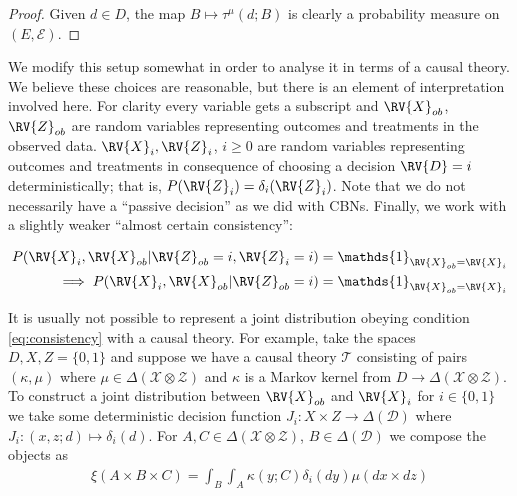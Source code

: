 \begin{proof}
Given $d\in D$, the map $B\mapsto \tau^\mu(d;B)$ is clearly a probability measure on $(E,\mathcal{E})$.

 
\end{proof}




We modify this setup somewhat in order to analyse it in terms of a causal theory. We believe these choices are reasonable, but there is an element of interpretation involved here. For clarity every variable gets a subscript and $\RV{X}_{ob}$, $\RV{Z}_{ob}$ are random variables representing outcomes and treatments in the observed data. $\RV{X}_i, \RV{Z}_i$, $i\geq 0$ are random variables representing outcomes and treatments in consequence of choosing a decision $\RV{D}=i$ deterministically; that is, $P(\RV{Z}_i) = \delta_i(\RV{Z}_i)$. Note that we do not necessarily have a ``passive decision'' as we did with CBNs. Finally, we work with a slightly weaker ``almost certain consistency'':

\begin{align}
    P(\RV{X}_i,\RV{X}_{ob}|\RV{Z}_{ob}=i,\RV{Z}_i=i)&=\mathds{1}_{\RV{X}_{ob}=\RV{X}_i} \label{eq:consistency}\\
    \implies P(\RV{X}_i,\RV{X}_{ob}|\RV{Z}_{ob}=i)&=\mathds{1}_{\RV{X}_{ob}=\RV{X}_i}
\end{align}

It is usually not possible to represent a joint distribution obeying condition \ref{eq:consistency} with a causal theory. For example, take the spaces $D,X,Z=\{0,1\}$ and suppose we have a causal theory $\mathscr{T}$ consisting of pairs $(\kappa,\mu)$ where $\mu\in\Delta(\mathcal{X}\otimes\mathcal{Z})$ and $\kappa$ is a Markov kernel from $D\to \Delta(\mathcal{X}\otimes\mathcal{Z})$. To construct a joint distribution between $\RV{X}_{ob}$ and $\RV{X}_i$ for $i\in \{0,1\}$ we take some deterministic decision function $J_i:X\times Z\to \Delta(\mathcal{D})$ where $J_i:(x,z;d)\mapsto \delta_i(d)$. For $A,C\in \Delta(\mathcal{X}\otimes\mathcal{Z})$, $B\in \Delta(\mathcal{D})$ we compose the objects as 
\begin{align}
    \xi(A\times B\times C) =  \int_B \int_A  \kappa(y; C) \delta_i(dy) \mu(dx\times dz)
\end{align}

